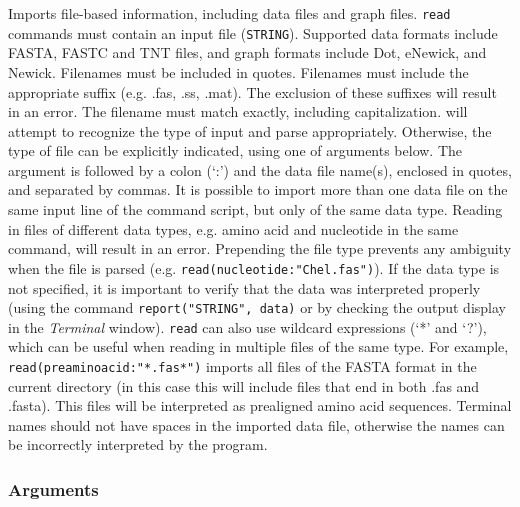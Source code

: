 	\begin{phygdescription}
		{Imports file-based information, including data files and graph files. \texttt{read} 
		commands must contain an input file (\texttt{STRING}). Supported data formats 
		include FASTA, FASTC and TNT files, and graph formats include Dot, eNewick, %
		and Newick. Filenames must be included in quotes. Filenames must include the 
		appropriate suffix (e.g. .fas, .ss, .mat). The exclusion of these suffixes will result 
		in an error. The filename must match exactly, including capitalization. \phyg will 
		attempt to recognize the type of input and parse appropriately. Otherwise, the 
		type of file can be explicitly indicated, using one of arguments below. The argument 
		is followed by a colon (`:') and the data file name(s), enclosed in quotes, and 
		separated by commas. It is possible to import more than one data file on the 
		same input line of the command script, but only of the same data type. Reading 
		in files of different data types, e.g. amino acid and nucleotide in the same command, 
		will result in an error. Prepending the file type prevents any ambiguity when the file is parsed
		(e.g. \texttt{read(nucleotide:"Chel.fas")}). If the data type is not specified, it is 
		important to verify that the data was interpreted properly (using the command 
		\texttt{report("STRING", data)} or by checking the output display in the 
		\textit{Terminal} window). \texttt{read} can also use wildcard expressions 
		(`*' and `?'), which can be useful when reading in multiple files of the 
		same type. For example, \texttt{read(preaminoacid:"*.fas*")} imports all files of the 
		FASTA format in the current directory (in this case this will include files that end 
		in both .fas and .fasta). This files will be interpreted as prealigned amino acid
		sequences. Terminal names should not have spaces in the imported 
		data file, otherwise the names can be incorrectly interpreted by the program.} 
	\end{phygdescription}

	\subsubsection{Arguments}
	
